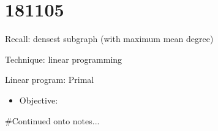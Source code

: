 \chapter{181105}

	Recall: densest subgraph (with maximum mean degree)

	Technique: linear programming

	Linear program: Primal
	\begin{itemize}
		\item Objective: $ $
	\end{itemize}

	\#Continued onto notes...
